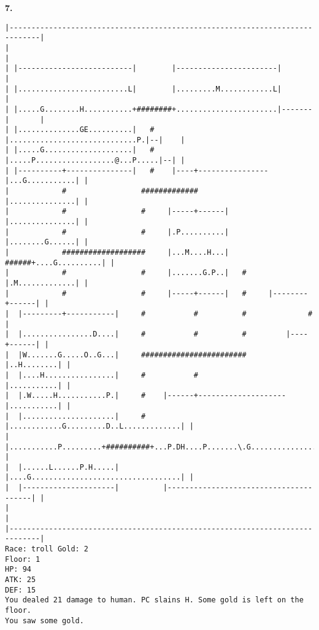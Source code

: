 \documentclass[11pt]{article}
\theoremstyle{plain}
\begin{document}
\newpage
\textbf{7. }
\begin{Verbatim}[fontsize=\scriptsize]
|-----------------------------------------------------------------------------|
|                                                                             |
| |--------------------------|        |-----------------------|               |
| |.........................L|        |.........M............L|               |
| |.....G........H...........+########+.......................|-------|       |
| |..............GE..........|   #    |.............................P.|--|    |
| |.....G....................|   #    |.....P..................@...P.....|--| |
| |----------+---------------|   #    |----+----------------|...G...........| |
|            #                 #############                |...............| |
|            #                 #     |-----+------|         |...............| |
|            #                 #     |.P..........|         |........G......| |
|            ###################     |...M....H...|   ######+....G..........| |
|            #                 #     |.......G.P..|   #     |.M.............| |
|            #                 #     |-----+------|   #     |--------+------| |
|  |---------+-----------|     #           #          #              #        |
|  |................D....|     #           #          #         |----+------| |
|  |W.......G.....O..G...|     ########################         |..H........| |
|  |....H................|     #           #                    |...........| |
|  |.W.....H...........P.|     #    |------+--------------------|...........| |
|  |.....................|     #    |............G.........D..L.............| |
|  |...........P.........+##########+...P.DH....P.......\.G................W| |
|  |......L......P.H.....|          |....G..................................| |
|  |---------------------|          |---------------------------------------| |
|                                                                             |
|-----------------------------------------------------------------------------|
Race: troll Gold: 2                                                    Floor: 1
HP: 94
ATK: 25
DEF: 15
You dealed 21 damage to human. PC slains H. Some gold is left on the floor. 
You saw some gold. 
\end{Verbatim}
\end{document}
